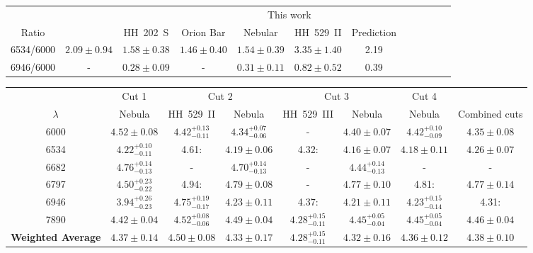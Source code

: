 \documentclass[fleqn,usenatbib]{mnras}
\begin{document}
\begin{table*}
\centering
\caption{Comparison of the observed [Ni\thinspace III] intensity ratios and theoretical ones  predicted by the transition probabilities adopted in Table~\ref{tab:atomic_data}}
\label{tab:intensity_ni3}
\begin{tabular}{cccccccccccc}
\hline
& & \citet{mesadelgado09} & \citet{delgadoinglada16} & \multicolumn{2}{c}{This work} &  \\
Ratio & \citet{Esteban04} & HH~202~S &  Orion Bar &  Nebular &  HH~529~II & Prediction\\
\hline
6534/6000& $2.09\pm0.94$  & $1.58 \pm 0.38$ & $1.46\pm 0.40$ & $1.54\pm 0.39$ & $3.35\pm1.40$ & 2.19\\
6946/6000& -&$0.28 \pm 0.09$&-& $0.31\pm 0.11$&$0.82\pm 0.52$&0.39\\
\hline
\end{tabular}
\end{table*}


\begin{table*}
\centering
\caption{Ni$^{2+}$/H$^{+}$ abundances per line.}
\label{tab:Ni3_abundances}
\begin{tabular}{cccccccc}
\hline
 & \multicolumn{1}{c}{Cut 1} & \multicolumn{2}{c}{Cut 2} & \multicolumn{2}{c}{Cut 3} & \multicolumn{1}{c}{Cut 4} \\
$\lambda$ &  Nebula & HH~529~II &  Nebula & HH~529~III &  Nebula &  Nebula & Combined cuts\\
\hline

6000 & $4.52 \pm 0.08$ & $4.42^{+0.13} _{-0.11}$  & $4.34^{+0.07} _{-0.06}$ &  - & $4.40 \pm 0.07$ & $4.42^{+0.10} _{-0.09}$ & $4.35 \pm 0.08$ \\
6534 & $4.22^{+0.10} _{-0.11}$ &4.61:  & $4.19 \pm 0.06$ &4.32:   & $4.16 \pm 0.07$ & $4.18 \pm 0.11$ & $4.26 \pm 0.07$ \\
6682 & $4.76^{+0.14} _{-0.13}$ & - & $4.70^{+0.14} _{-0.13}$ & - & $4.44^{+0.14} _{-0.13}$ & -& -\\
6797 & $4.50^{+0.23} _{-0.22}$ & 4.94:  & $4.79 \pm 0.08$ & - & $4.77 \pm 0.10$ & 4.81: & $4.77 \pm 0.14$ \\
6946 & $3.94^{+0.26} _{-0.23}$ & $4.75^{+0.19} _{-0.17}$ & $4.23 \pm 0.11$& 4.37:  & $4.21 \pm 0.11$ & $4.23^{+0.15} _{-0.14}$ & 4.31:\\
7890 & $4.42 \pm 0.04$ & $4.52^{+0.08} _{-0.06}$ & $4.49 \pm 0.04$ &  $4.28^{+0.15} _{-0.11}$ & $4.45^{+0.05} _{-0.04}$  & $4.45^{+0.05} _{-0.04}$ & $4.46 \pm 0.04$ \\

\textbf{Weighted Average} & \boldmath$4.37 \pm 0.14$ &\boldmath$4.50\pm 0.08$&\boldmath$4.33 \pm 0.17$ &\boldmath$4.28^{+0.15} _{-0.11}$ & \boldmath$4.32 \pm 0.16$&\boldmath$4.36 \pm 0.12$&\boldmath$4.38 \pm 0.10$\\

\hline
\end{tabular}
\end{table*}
\end{document}
